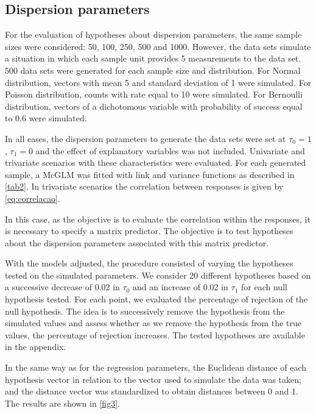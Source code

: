 \documentclass[AMA,STIX1COL]{WileyNJD-v2}
\begin{document}
\subsection{Dispersion parameters}

For the evaluation of hypotheses about dispersion parameters, the same sample sizes were considered: 50, 100, 250, 500 and 1000. However, the data sets simulate a situation in which each sample unit provides 5 measurements to the data set. 500 data sets were generated for each sample size and distribution. For Normal distribution, vectors with mean 5 and standard deviation of 1 were simulated. For Poisson distribution, counts with rate equal to 10 were simulated. For Bernoulli distribution, vectors of a dichotomous variable with probability of success equal to 0.6 were simulated.

In all cases, the dispersion parameters to generate the data sets were set at $\tau_0 = 1$, $\tau_1 = 0$ and the effect of explanatory variables was not included. Univariate and trivariate scenarios with these characteristics were evaluated. For each generated sample, a McGLM was fitted with link and variance functions as described in \autoref{tab2}. In trivariate scenarios the correlation between responses is given by \autoref{eq:correlacao}.

In this case, as the objective is to evaluate the correlation within the responses, it is necessary to specify a matrix predictor. The objective is to test hypotheses about the dispersion parameters associated with this matrix predictor. 

With the models adjusted, the procedure consisted of varying the hypotheses tested on the simulated parameters. We consider 20 different hypotheses based on a successive decrease of 0.02 in $\tau_0$ and an increase of 0.02 in $\tau_1$ for each null hypothesis tested. For each point, we evaluated the percentage of rejection of the null hypothesis. The idea is to successively remove the hypothesis from the simulated values and assess whether as we remove the hypothesis from the true values, the percentage of rejection increases. The tested hypotheses are available in the appendix.

In the same way as for the regression parameters, the Euclidean distance of each hypothesis vector in relation to the vector used to simulate the data was taken; and the distance vector was standardized to obtain distances between 0 and 1. The results are shown in \autoref{fig3}.
\end{document}
